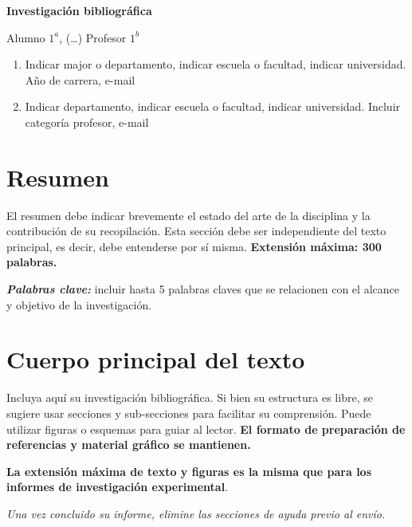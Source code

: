 \newpage
\begin{center}
    \LARGE
    \textbf{Investigación bibliográfica}
    \label{sec:investigacion_bibliografica}
    
    \vspace{0.4cm}
    \large
    Alumno $1^a$, (…) Profesor $1^b$ 

    \vspace{0.4cm}
\end{center}

\begin{enumerate}[label=\alph*]
    \item Indicar major o departamento, indicar escuela o
facultad, indicar universidad. Año de carrera, e-mail
    \item Indicar departamento, indicar escuela o facultad,
indicar universidad. Incluir categoría profesor, e-mail
\end{enumerate}

\hrulefill

\section*{Resumen}

El resumen debe indicar brevemente el estado del arte de la disciplina y la contribución de su recopilación. Esta sección debe ser independiente del texto principal, es decir, debe entenderse por sí misma. \textbf{Extensión máxima: 300 palabras.}

\textit{\textbf{Palabras clave:}} incluir hasta 5 palabras claves que se relacionen con el alcance y objetivo de la investigación.

\hrulefill


\section*{Cuerpo principal del texto}

Incluya aquí su investigación bibliográfica. Si bien su estructura es libre, se sugiere usar secciones y sub-secciones para facilitar su comprensión. Puede utilizar figuras o esquemas para guiar al lector. \textbf{El formato de preparación de referencias y material gráfico se mantienen.}

\textbf{La extensión máxima de texto y figuras es la misma que para los informes de investigación experimental}.

\emph{Una vez concluido su informe, elimine las secciones de ayuda previo al envío.}

\newpage